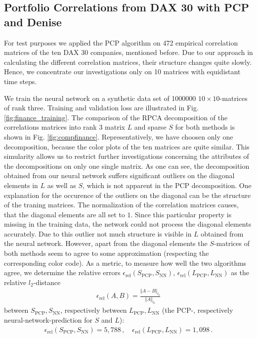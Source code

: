 \subsection{Portfolio Correlations from DAX 30 with PCP and Denise}
For test purposes we applied the PCP algorithm on 472 empirical correlation matrices of the ten DAX 30 companies, mentioned before. Due to our approach in calculating the different correlation matrices, their structure changes quite slowly. Hence, we concentrate our investigations only on 10 matrices with equidistant time steps.
\par
We train the neural network on a synthetic data set of 1000000 $10\times 10$-matrices of rank three. Training and validation loss are illustrated in Fig. \ref{fig:finance_training}. The comparison of the RPCA decomposition of the correlations matrices into rank $3$ matrix $L$ and sparse $S$ for both methods is shown in Fig. \ref{fig:compfinance}. Representatively, we have choosen only one decomposition, because the color plots of the ten matrices are quite similar. This simularity allows us to restrict further investigations  concerning the attributes of the decompositions on only one single matrix. As one can see, the decomposition obtained from our neural network suffers significant outliers on the diagonal elements in $L$ as well as $S$, which is not apparent in the PCP decomposition. One explanation for the occurence of the outliers on the diagonal can be the structure of the traning matrices. The normalization of the correlation matrices causes, that the diagonal elements are all set to $1$. Since this particular property is missing in the training data, the network could not process the diagonal elements accurately. Due to this outlier not much structure is visible in $L$ obtained from the neural network. However, apart from the diagonal elements the $S$-matrices of both methods seem to agree to some approximation (respecting the corresponding color code). As a metric, to measure how well the two algorithms agree, we determine the relative errors $\epsilon_\text{rel} (S_\text{PCP}, S_\text{NN}),\, \epsilon_\text{rel} (L_\text{PCP}, L_\text{NN})$ as the relative $l_2$-distance
\begin{align}
\epsilon_\text{rel}(A,B) = \frac{\Vert A - B \Vert_{l_2}}{\Vert A \Vert_{l_2}}
\end{align}
between $S_\text{PCP}, S_\text{NN}$, respectively between $L_\text{PCP}, L_\text{NN}$ (the PCP-, respectively neural-network-prediction for $S$ and $L$):
\begin{align}
\epsilon_\text{rel}(S_\text{PCP},S_\text{NN}) = 5,788\,, \quad  \epsilon_\text{rel}(L_\text{PCP},L_\text{NN}) = 1,098 \,.
\end{align}
